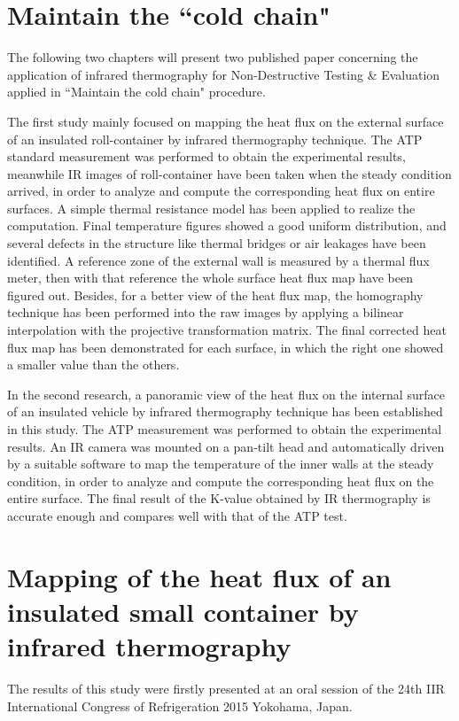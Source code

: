 \chapter*{Maintain the ``cold chain"}     %
The following two chapters will present two published paper concerning the application of infrared thermography for Non-Destructive Testing \& Evaluation applied in ``Maintain the cold chain" procedure.

The first study mainly focused on mapping the heat flux on the external surface of an insulated roll-container by infrared thermography technique. The ATP standard measurement was performed to obtain the experimental results, meanwhile IR images of roll-container have been taken when the steady condition arrived, in order to analyze and compute the corresponding heat flux on entire surfaces. A simple thermal resistance model has been applied to realize the computation. Final temperature figures showed a good uniform distribution, and several defects in the structure like thermal bridges or air leakages have been identified. A reference zone of the external wall is measured by a thermal flux meter, then with that reference the whole surface heat flux map have been figured out. Besides, for a better view of the heat flux map, the homography technique has been performed into the raw images by applying a bilinear interpolation with the projective transformation matrix. The final corrected heat flux map has been demonstrated for each surface, in which the right one showed a smaller value than the others. 

In the second research, a panoramic view of the heat flux on the internal surface of an insulated vehicle by infrared thermography technique has been established in this study. The ATP measurement was performed to obtain the experimental results.  An IR camera was mounted on a pan-tilt head and automatically driven by a suitable software to map the temperature of the inner walls at the steady condition, in order to analyze and compute the corresponding heat flux on the entire surface.  The final result of the K-value obtained by IR thermography is accurate enough and compares well with that of the ATP test.

\chapter{Mapping of the heat flux of an insulated small container by infrared thermography}
The results of this study were firstly presented at an oral session of the 24th IIR International Congress of Refrigeration 2015 Yokohama, Japan.

